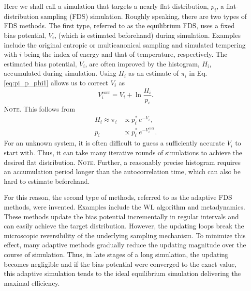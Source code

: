 \documentclass[reprint, floatfix]{revtex4-1}
\newcommand{\note}[1]{{\color{DarkGreen}\footnotesize \textsc{Note.} #1}}
\begin{document}
Here we shall call a simulation that targets
a nearly flat distribution\cite{
dayal2004, trebst2004, zhang2007, barducci2008, singh2011},
$p_i$,
a flat-distribution sampling (FDS) simulation.
%
Roughly speaking, there are two types of FDS methods.
%
The first type,
referred to as the equilibrium FDS, %
uses a fixed bias potential, $V_i$,
(which is estimated beforehand)
during simulation.
%
Examples include the original
entropic or multicanonical sampling\cite{
berg1992, lee1993}
and simulated tempering\cite{
marinari1992, lyubartsev1992}
with $i$ being the index of energy
and that of temperature, respectively.
%
The estimated bias potential, $V_i$,
are often improved
by the histogram, $H_i$, accumulated
during simulation.
%
Using $H_i$ as an estimate of $\pi_i$ in
Eq. \eqref{eq:pi_p_phi1}
allows us to correct $V_i$ as
%
\begin{equation}
V^\mathrm{corr}_i
=
V_i
+
\ln \frac{ H_i }
         { p_i }.
\label{eq:vcorr_equil}
\end{equation}
%
\note{This follows from
  $$
  \begin{aligned}
    H_i \approx \pi_i
    &\propto p^*_i \, e^{-V_i},
    \\
    p_i
    &\propto p^*_i \, e^{-V^\mathrm{corr}_i}.
  \end{aligned}
  $$
}
For an unknown system,
it is often difficult
to guess a sufficiently accurate
$V_i$ to start with.
%
Thus,
it can take many iterative rounds of simulations
to achieve the desired flat distribution.
%
\note{Further, a reasonably precise histogram
requires an accumulation period
longer than the autocorrelation time,
which can also be hard to estimate beforehand.}

For this reason, the second type of methods,
referred to as the adaptive FDS methods,
were invented.
%
Examples include
the WL algorithm and metadynamics.
%
These methods update the bias potential
incrementally in regular intervals
and can easily achieve the target distribution.
%
However,
the updating loops break the microscopic reversibility
of the underlying sampling mechanism.
%
%
To minimize this effect,
many adaptive methods gradually
reduce the updating magnitude
over the course of simulation\cite{
marsili2006,
liang2007,
belardinelli2007, belardinelli2007jcp, belardinelli2008,
barducci2008}.
%
Thus, in late stages of a long simulation,
the updating becomes negligible and
%
if the bias potential were converged to the exact value,
this adaptive simulation tends to the ideal equilibrium simulation
delivering the maximal efficiency.
\end{document}
